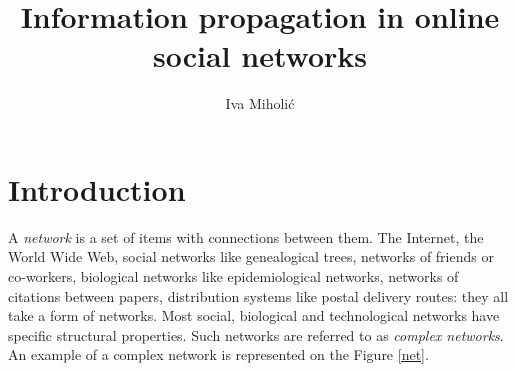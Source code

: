 \documentclass[times, utf8, zavrsni]{fer}
\begin{document}

\title{Information propagation in online social networks}

\author{Iva Miholić}

\maketitle

\izvornik{}

\tableofcontents
\clearpage
\listoffigures
\listoftables

\chapter{Introduction}

A \emph{network} is a set of items with connections between them. The Internet, the World Wide Web, social networks like genealogical trees, networks of friends or co-workers, biological networks like epidemiological networks, networks of citations between papers, distribution systems like postal delivery routes: they all take a form of networks. Most social, biological and technological networks have specific structural properties. Such networks are referred to as \emph{complex networks}.  An example of a complex network is represented on the Figure \ref{net}.
\end{document}
